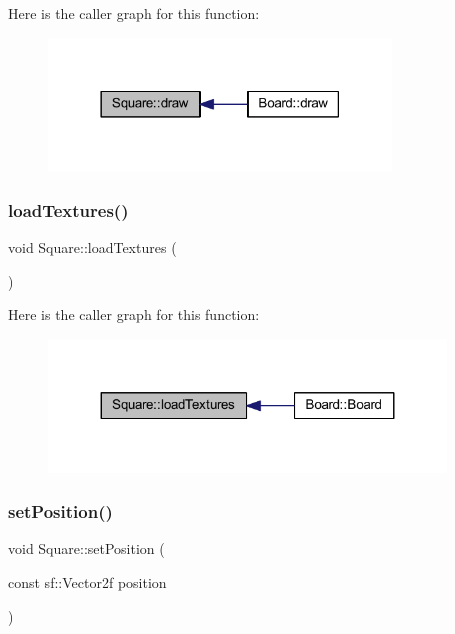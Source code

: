 Here is the caller graph for this function\+:
\nopagebreak
\begin{figure}[H]
\begin{center}
\leavevmode
\includegraphics[width=258pt]{class_square_a6665fa34ce5e672a880a253b1a21fb78_icgraph}
\end{center}
\end{figure}
\mbox{\label{class_square_af03bbde12cc43feb90c4f0676e00ce72}} 
\subsubsection{\texorpdfstring{load\+Textures()}{loadTextures()}}
{\footnotesize\ttfamily void Square\+::load\+Textures (\begin{DoxyParamCaption}{ }\end{DoxyParamCaption})\hspace{0.3cm}{\ttfamily [static]}}

Here is the caller graph for this function\+:
\nopagebreak
\begin{figure}[H]
\begin{center}
\leavevmode
\includegraphics[width=299pt]{class_square_af03bbde12cc43feb90c4f0676e00ce72_icgraph}
\end{center}
\end{figure}
\mbox{\label{class_square_a9040f1ca39b88b8d9ac2a90648b1fb20}} 
\subsubsection{\texorpdfstring{set\+Position()}{setPosition()}}
{\footnotesize\ttfamily void Square\+::set\+Position (\begin{DoxyParamCaption}\item[{const sf\+::\+Vector2f}]{position }\end{DoxyParamCaption})}

